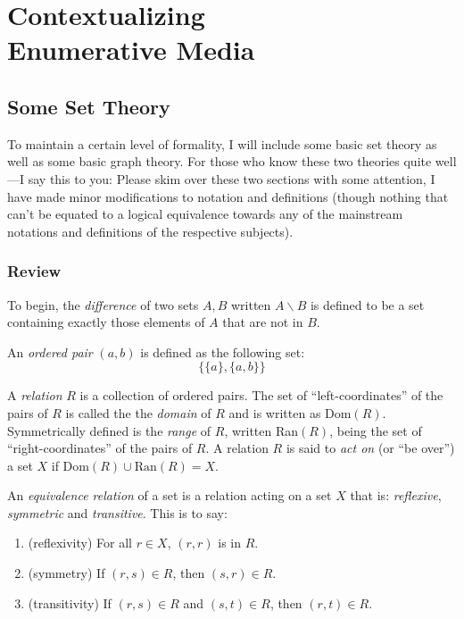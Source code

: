 \documentclass[twoside]{book}
\begin{document}
\mainmatter
\part{\texorpdfstring{Contextualizing\\ Enumerative Media}{Contextualizing Enumerative Media}}
\chapter{Some Set Theory}

To maintain a certain level of formality, I will include some basic set theory as well as some basic graph theory.
For those who know these two theories quite well---I say this to you:  Please skim over these two sections with
some attention, I have made minor modifications to notation and definitions (though nothing that can't be equated
to a logical equivalence towards any of the mainstream notations and definitions of the respective subjects).

\section{Review}

To begin, the \emph{difference} of two sets $ A, B $ written $ A\backslash B $
is defined to be a set containing exactly those elements of $ A $ that are not in $ B $.

An \emph{ordered pair} $ (a, b) $ is defined as the following set:
$$ \{\{a\}, \{a, b\}\} $$

A \emph{relation} $ R $ is a collection of ordered pairs.  The set of ``left-coordinates'' of the pairs of $ R $
is called the the \emph{domain} of $ R $ and is written as Dom$ (R) $.  Symmetrically defined is the \emph{range}
of $ R $, written Ran$ (R) $, being the set of ``right-coordinates'' of the pairs of $ R $.  A relation $ R $ is
said to \emph{act on} (or ``be over'') a set $ X $ if $ \mbox{Dom}(R)\cup\mbox{Ran}(R)=X $.

An \emph{equivalence relation} of a set is a relation acting on a set $ X $ that is: \emph{reflexive}, \emph{symmetric}
and \emph{transitive}.  This is to say:
\begin{enumerate}
\item (reflexivity) For all $ r\in X $, $ (r, r) $ is in $ R $.
\item (symmetry) If $ (r, s)\in R $, then $ (s, r)\in R $.
\item (transitivity) If $ (r, s)\in R $ and $ (s, t)\in R $, then $ (r, t)\in R $.
\end{enumerate}
\end{document}
